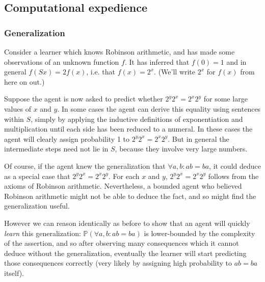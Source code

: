 \documentclass[12pt]{article}
\theoremstyle{definition}
\newcommand{\of}[1]{\left(#1\right)}
\renewcommand{\P}[1]{\mathbb{P}\of{#1}}
\begin{document}

\subsection{Computational expedience}


\subsubsection{Generalization}

Consider a learner which knows Robinson arithmetic,
and has made some observations of an unknown function $f$.
It has inferred that $f(0) = 1$ and in general $f( S x) = 2 f(x)$, i.e. that $f(x) = 2^x$.
(We'll write $2^x$ for $f(x)$ from here on out.)

Suppose the agent is now asked to predict whether $2^y 2^x = 2^x 2^y$ for some
large values of $x$ and $y$.
In some cases the agent can derive this equality using sentences within $S$,
simply by applying the inductive definitions of exponentiation and multiplication
until each side has been reduced to a numeral.
In these cases the agent will clearly assign probability 1 to $2^y 2^x = 2^x 2^y$.
But in general the intermediate steps need not lie in $S$,
because they involve very large numbers.

Of course, if the agent knew the generalization
that $\forall a, b : a b = b a$, 
it could deduce as a special case that $2^y 2^x = 2^x 2^y$.
For each $x$ and $y$, $2^y 2^x = 2^x 2^y$ follows from the axioms of Robinson arithmetic.
Nevertheless, a bounded agent who believed Robinson arithmetic
might not be able to deduce the fact, and so might find the generalization useful.

However we can reason identically as before to show that an agent
will quickly \emph{learn} this generalization: $\P{\forall a, b: ab = ba}$
is lower-bounded by the complexity of the assertion, and so after
observing many consequences which it cannot deduce without the generalization,
eventually the learner will start predicting those consequences correctly
(very likely by assigning high probability to $ab = ba$ itself).
\end{document}
